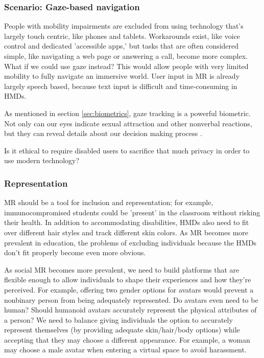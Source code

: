 \subsubsection{Scenario: Gaze-based navigation}

People with mobility impairments are excluded from using technology that's largely touch centric, like phones and tablets. Workarounds exist, like voice control and dedicated 'accessible apps,' but tasks that are often considered simple, like navigating a web page or answering a call, become more complex. What if we could use gaze instead? This would allow people with very limited mobility to fully navigate an immersive world. User input in MR is already largely speech based, because text input is difficult and time-consuming in HMDs.

As mentioned in section \ref{sec:biometrics}, gaze tracking is a powerful biometric. Not only can our eyes indicate sexual attraction and other nonverbal reactions, but they can reveal details about our decision making process \cite{costandi}.

Is it ethical to require disabled users to sacrifice that much privacy in order to use modern technology?


\subsubsection{Representation}

MR should be a tool for inclusion and representation; for example, immunocompromised students could be 'present' in the classroom without risking their health.  In addition to accommodating disabilities, HMDs also need to fit over different hair styles and track different skin colors. As MR becomes more prevalent in education, the problems of excluding individuals because the HMDs don't fit properly become even more obvious.

As social MR becomes more prevalent, we need to build platforms that are flexible enough to allow individuals to shape their experiences and how they're perceived. For example, offering two gender options for avatars would prevent a nonbinary person from being adequately represented. Do avatars even need to be human? Should humanoid avatars accurately represent the physical attributes of a person? We need to balance giving individuals the option to accurately represent themselves (by providing adequate skin/hair/body options) while accepting that they may choose a different appearance. For example, a woman may choose a male avatar when entering a virtual space to avoid harassment.

